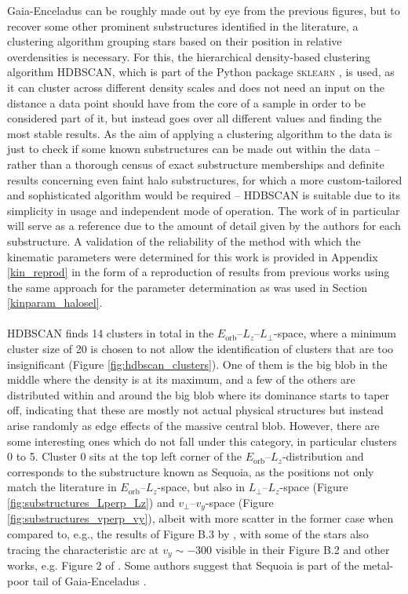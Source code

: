 \documentclass[a4paper,11pt]{article}
\begin{document}
%
Gaia-Enceladus can be roughly made out by eye from the previous figures, but to recover some other prominent substructures identified in the literature, a clustering algorithm grouping stars based on their position in relative overdensities is necessary. For this, the hierarchical density-based clustering algorithm \textsc{HDBSCAN}, which is part of the Python package \textsc{sklearn} \citep{sklearn}, is used, as it can cluster across different density scales and does not need an input on the distance a data point should have from the core of a sample in order to be considered part of it, but instead goes over all different values and finding the most stable results. As the aim of applying a clustering algorithm to the data is just to check if some known substructures can be made out within the data -- rather than a thorough census of exact substructure memberships and definite results concerning even faint halo substructures, for which a more custom-tailored and sophisticated algorithm would be required -- \textsc{HDBSCAN} is suitable due to its simplicity in usage and independent mode of operation. The work of \citet{ruizlara22} in particular will serve as a reference due to the amount of detail given by the authors for each substructure. A validation of the reliability of the method with which the kinematic parameters were determined for this work is provided in Appendix \ref{kin_reprod} in the form of a reproduction of results from previous works using the same approach for the parameter determination as was used in Section \ref{kinparam_halosel}.\\ \\
%
\textsc{HDBSCAN} finds 14 clusters in total in the $E_\mathrm{orb}$--$L_z$--$L_\perp$-space, where a minimum cluster size of 20 is chosen to not allow the identification of clusters that are too insignificant (Figure \ref{fig:hdbscan_clusters}). One of them is the big blob in the middle where the density is at its maximum, and a few of the others are distributed within and around the big blob where its dominance starts to taper off, indicating that these are mostly not actual physical structures but instead arise randomly as edge effects of the massive central blob. However, there are some interesting ones which do not fall under this category, in particular clusters 0 to 5. Cluster 0 sits at the top left corner of the $E_\mathrm{orb}$--$L_z$-distribution and corresponds to the substructure known as Sequoia, as the positions not only match the literature in $E_\mathrm{orb}$--$L_z$-space, but also in $L_\perp$--$L_z$-space (Figure \ref{fig:substructures_Lperp_Lz}) and $v_\perp$--$v_y$-space (Figure \ref{fig:substructures_vperp_vy}), albeit with more scatter in the former case when compared to, e.g., the results of Figure B.3 by \citet{ruizlara22}, with some of the stars also tracing the characteristic arc at $v_y\sim-300$ visible in their Figure B.2 and other works, e.g. Figure 2 of \citep{koppelman19a}. Some authors suggest that Sequoia is part of the metal-poor tail of Gaia-Enceladus \citep[e.g.,][]{koppelman19a}.
\end{document}
